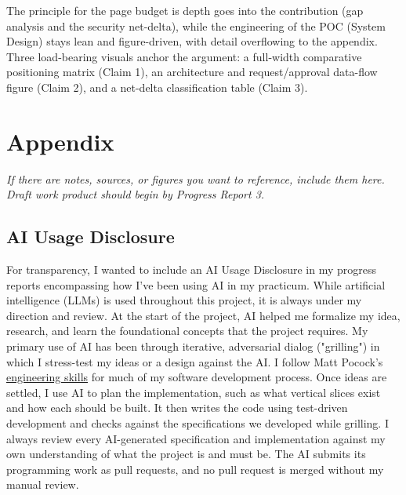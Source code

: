 \documentclass[12pt]{article}
\newcommand{\instruction}[1]{{\small\itshape #1}}
\begin{document}
The principle for the page budget is depth goes into the contribution (gap analysis and the security net-delta), while the engineering of the POC (System Design) stays lean and figure-driven, with detail overflowing to the appendix. Three load-bearing visuals anchor the argument: a full-width comparative positioning matrix (Claim 1), an architecture and request/approval data-flow figure (Claim 2), and a net-delta classification table (Claim 3).




\newpage
\section*{Appendix}

\instruction{If there are notes, sources, or figures you want to reference, include them here. Draft work product should begin by Progress Report 3.}

\subsection*{AI Usage Disclosure}

For transparency, I wanted to include an AI Usage Disclosure in my progress reports encompassing how I've been using AI in my practicum. While artificial intelligence (LLMs) is used throughout this project, it is always under my direction and review. At the start of the project, AI helped me formalize my idea, research, and learn the foundational concepts that the project requires. My primary use of AI has been through iterative, adversarial dialog ("grilling") in which I stress-test my ideas or a design against the AI. I follow Matt Pocock's \href{https://github.com/mattpocock/skills\#engineering}{engineering skills} for much of my software development process. Once ideas are settled, I use AI to plan the implementation, such as what vertical slices exist and how each should be built. It then writes the code using test-driven development and checks against the specifications we developed while grilling. I always review every AI-generated specification and implementation against my own understanding of what the project is and must be. The AI submits its programming work as pull requests, and no pull request is merged without my manual review.
\end{document}
